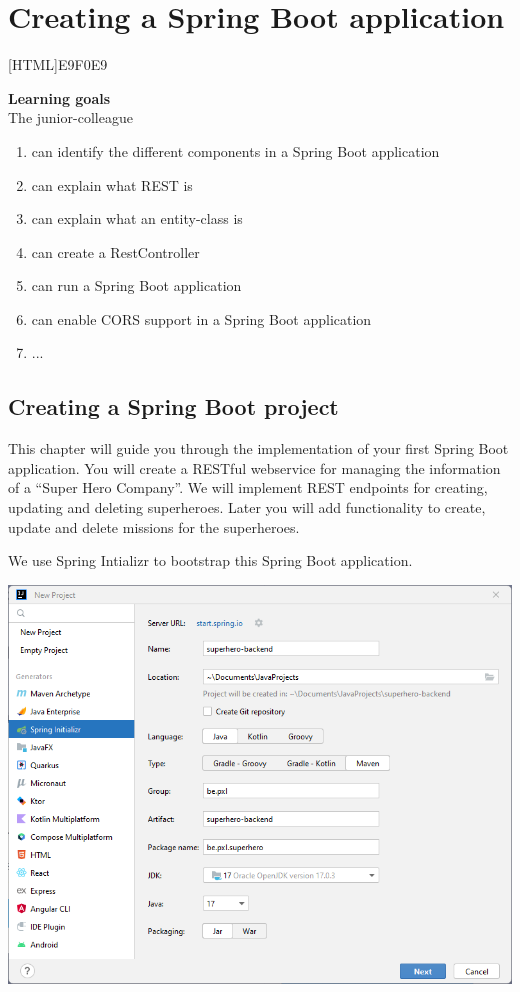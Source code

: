 \chapter{Creating a Spring Boot application}

[HTML]{E9F0E9}{\parbox{\textwidth}{%
\noindent \textbf{Learning goals}\\
The junior-colleague
\begin{enumerate}[nolistsep]
\item can identify the different components in a Spring Boot application
\item can explain what REST is
\item can explain what an entity-class is
\item can create a RestController
\item can run a Spring Boot application
\item can enable CORS support in a Spring Boot application
\item ...
\end{enumerate}}}


\section{Creating a Spring Boot project}

This chapter will guide you through the implementation of your first Spring Boot application. You will create a RESTful webservice for managing the information of a ``Super Hero Company''. We will implement REST endpoints for creating, updating and deleting superheroes. Later you will add functionality to create, update and delete missions for the superheroes.

We use Spring Intializr to bootstrap this Spring Boot application. 

\includegraphics[width=\textwidth]{./images/chapter2/new_project.png} 

